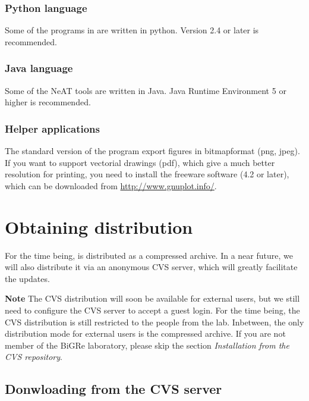 \documentclass[12pt,a4paper, oneside]{scrreprt} %
\begin{document}
\subsection{Python language}

Some of the programs in \RSAT are written in python. Version 2.4 or
later is recommended.

\subsection{Java language}

Some of the NeAT tools are written in Java. Java Runtime Environment 5
or higher is recommended.

\subsection{Helper applications}

The standard version of the program  export figures
in bitmapformat (png, jpeg). If you want to support vectorial drawings
(pdf), which give a much better resolution for printing, you need to
install the freeware software  (4.2 or later), which
can be downloaded from \url{http://www.gnuplot.info/}.



\chapter{Obtaining \RSAT distribution}

For the time being, \RSAT is distributed as a compressed archive. In a
near future, we will also distribute it via an anonymous CVS server,
which will greatly facilitate the updates.

\textbf{Note} The CVS distribution will soon be available for external
users, but we still need to configure the CVS server to accept a guest
login. For the time being, the CVS distribution is still restricted to
the people from the lab. Inbetween, the only distribution mode for
external users is the compressed archive. If you are not member of the
BiGRe laboratory, please skip the section \textit{Installation from
  the CVS repository}.

\section{Donwloading \RSAT from the CVS server}
\end{document}
